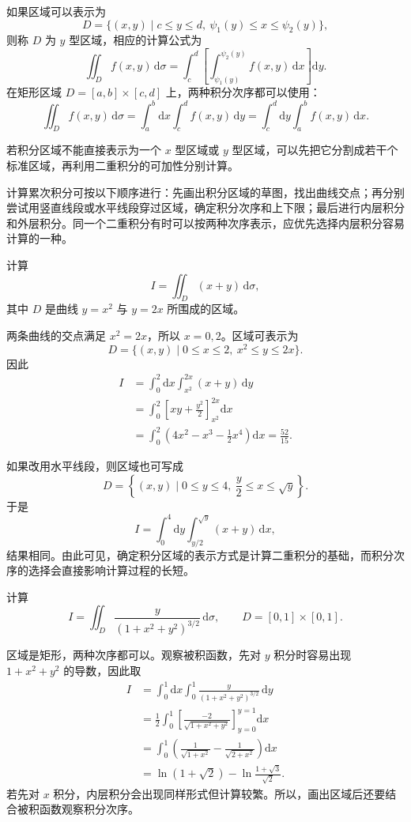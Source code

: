 \documentclass[fontset=fandol]{ctexart}
\newcommand{\dd}{\mathrm{d}}
\begin{document}
如果区域可以表示为
\[
D=\{(x,y)\mid c\leq y\leq d,\ \psi_1(y)\leq x\leq\psi_2(y)\},
\]
则称 $D$ 为 $y$ 型区域，相应的计算公式为
\[
\iint_Df(x,y)\,\dd\sigma
=\int_c^d\left[\int_{\psi_1(y)}^{\psi_2(y)}f(x,y)\,\dd x\right]\dd y.
\]
在矩形区域 $D=[a,b]\times[c,d]$ 上，两种积分次序都可以使用：
\[
\iint_Df(x,y)\,\dd\sigma
=\int_a^b\dd x\int_c^df(x,y)\,\dd y
=\int_c^d\dd y\int_a^bf(x,y)\,\dd x.
\]

若积分区域不能直接表示为一个 $x$ 型区域或 $y$ 型区域，可以先把它分割成若干个标准区域，再利用二重积分的可加性分别计算。

计算累次积分可按以下顺序进行：先画出积分区域的草图，找出曲线交点；再分别尝试用竖直线段或水平线段穿过区域，确定积分次序和上下限；最后进行内层积分和外层积分。同一个二重积分有时可以按两种次序表示，应优先选择内层积分容易计算的一种。

\begin{example}[直角坐标下的累次积分]
计算
\[
I=\iint_D(x+y)\,\dd\sigma,
\]
其中 $D$ 是曲线 $y=x^2$ 与 $y=2x$ 所围成的区域。

两条曲线的交点满足 $x^2=2x$，所以 $x=0,2$。区域可表示为
\[
D=\{(x,y)\mid0\leq x\leq2,\ x^2\leq y\leq2x\}.
\]
因此
\[
\begin{aligned}
I&=\int_0^2\dd x\int_{x^2}^{2x}(x+y)\,\dd y\\
&=\int_0^2\left[xy+\frac{y^2}{2}\right]_{x^2}^{2x}\dd x\\
&=\int_0^2\left(4x^2-x^3-\frac12x^4\right)\dd x
=\frac{52}{15}.
\end{aligned}
\]

如果改用水平线段，则区域也可写成
\[
D=\left\{(x,y)\mid0\leq y\leq4,\ \frac y2\leq x\leq\sqrt y\right\}.
\]
于是
\[
I=\int_0^4\dd y\int_{y/2}^{\sqrt y}(x+y)\,\dd x,
\]
结果相同。由此可见，确定积分区域的表示方式是计算二重积分的基础，而积分次序的选择会直接影响计算过程的长短。
\end{example}

\begin{example}[根据被积函数选择积分次序]
计算
\[
I=\iint_D\frac{y}{(1+x^2+y^2)^{3/2}}\,\dd\sigma,
\qquad D=[0,1]\times[0,1].
\]

区域是矩形，两种次序都可以。观察被积函数，先对 $y$ 积分时容易出现 $1+x^2+y^2$ 的导数，因此取
\[
\begin{aligned}
I&=\int_0^1\dd x\int_0^1\frac{y}{(1+x^2+y^2)^{3/2}}\,\dd y\\
&=\frac12\int_0^1\left[\frac{-2}{\sqrt{1+x^2+y^2}}\right]_{y=0}^{y=1}\dd x\\
&=\int_0^1\left(\frac1{\sqrt{1+x^2}}-\frac1{\sqrt{2+x^2}}\right)\dd x\\
&=\ln(1+\sqrt2)-\ln\frac{1+\sqrt3}{\sqrt2}.
\end{aligned}
\]
若先对 $x$ 积分，内层积分会出现同样形式但计算较繁。所以，画出区域后还要结合被积函数观察积分次序。
\end{example}
\end{document}
